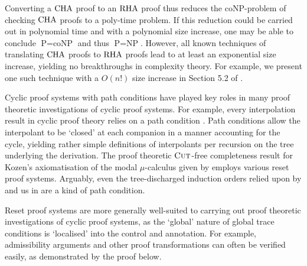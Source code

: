 Converting a $\mathrm{CHA}$ proof to an $\mathrm{RHA}$ proof thus reduces the coNP-problem of
checking $\mathrm{CHA}$ proofs to a poly-time problem. If this reduction could be
carried out in polynomial time and with a polynomial size increase, one may be
able to
conclude $\text{P} = \text{coNP}$ and thus $\text{P} = \text{NP}$. However, all
known techniques of translating $\mathrm{CHA}$ proofs to $\mathrm{RHA}$ proofs lead to at least
an exponential size increase, yielding no breakthroughs in complexity theory.
For example, we present one such technique with a $O(n!)$ size increase in
Section 5.2 of \papOne{}.

Cyclic proof systems with path conditions have played key roles in many proof
theoretic investigations of cyclic proof systems. For example, every
interpolation result in cyclic proof theory relies on a path condition
\parencite[see][]{shamkanovCircularProofsGodelLob2014,savateevNonWellFoundedProofsGrzegorczyk2018,martiFocusSystemAlternationFree2021,afshariUniformInterpolationCyclic2021,afshariLyndonInterpolationModal2022}.
Path conditions allow the
interpolant to be `closed' at each companion in a manner accounting for the
cycle, yielding rather simple definitions of interpolants per recursion on the
tree underlying the derivation.
The proof theoretic $\textsc{Cut}$-free completeness result for Kozen's axiomatisation
of the modal $\mu$-calculus given by \textcite{afshariFinitaryProofSystems2016}
employs various reset proof systems.
Arguably, even the tree-discharged induction orders relied upon by
\textcite{sprengerStructureInductiveReasoning2003} and us in \papTwo{} are a
kind of path condition.

Reset proof systems are more generally well-suited to carrying out proof theoretic
investigations of cyclic proof systems, as the `global' nature of global trace
conditions is `localised' into the control and annotation. For example,
admissibility arguments and other proof transformations can often be verified
easily, as demonstrated by the proof below.


